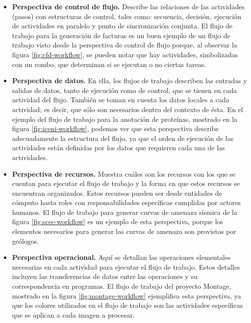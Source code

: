 \begin{itemize}
\item{\textbf{Perspectiva de control de flujo.} Describe las relaciones de las actividades (pasos) con estructuras de control, tales como: secuencia, decisión, ejecución de actividades en paralelo y punto de sincronización conjunta. El flujo de trabajo para la generación de facturas es un buen ejemplo de un flujo de trabajo visto desde la perspectiva de control de flujo porque, al observar la figura \ref{fig:cfd-workflow}, se pueden notar que hay actividades, simbolizadas con un rombo, que determinan si se ejecutan o no ciertas tareas.
}

\item{\textbf{Perspectiva de datos.} En ella, los flujos de trabajo describen las entradas y salidas de datos, tanto de ejecución como de control, que se tienen en cada actividad del flujo. También se toman en cuenta los datos locales a cada actividad; es decir, que sólo son necesarios dentro del contexto de ésta. En el ejemplo del flujo de trabajo para la anotación de proteínas, mostrado en la figura \ref{fig:iceni-workflow}, podemos ver que esta perspectiva describe adecuadamente la estructura del flujo, ya que el orden de ejecución de las actividades están definidas por los datos que requieren cada una de las actividades.}

\item{\textbf{Perspectiva de recursos.} Muestra cuáles son los recursos con los que se cuentan para ejecutar el flujo de trabajo y la forma en que estos recursos se encuentran organizados. Estos recursos pueden ser desde entidades de cómputo hasta roles con responsabilidades específicas cumplidas por actores humanos. El flujo de trabajo para generar curvas de amenaza sísmica de la figura \ref{fig:scec-workflow} es un ejemplo de esta perspectiva, porque los elementos necesarios para generar las curvas de amenaza son provistos por geólogos.}

\item{\textbf{Perspectiva operacional.} Aquí se detallan las operaciones elementales necesarias en cada actividad para ejecutar el flujo de trabajo. Estos detalles incluyen las transferencias de datos entre las operaciones y su correspondencia en programas. El flujo de trabajo del proyecto Montage, mostrado en la figura \ref{fig:montage-workflow} ejemplifica esta perspectiva, ya que los colores utilizados en el flujo de trabajo son las actividades específicas que se aplican a cada imagen a procesar.}
\end{itemize}

